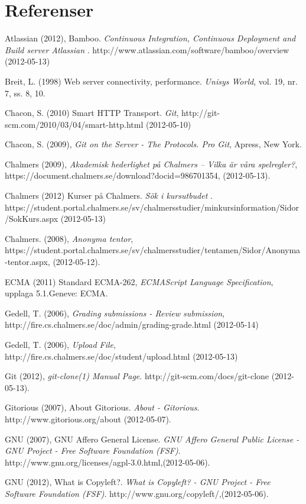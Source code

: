 
\renewcommand{\thechapter}{}
\chapter{Referenser}
\begin{flushleft}
\small
Atlassian (2012), Bamboo. \emph{Continuous Integration, Continuous Deployment and Build server Atlassian  }. http://www.atlassian.com/software/bamboo/overview (2012-05-13)

Breit, L. (1998) Web server connectivity, performance. \emph{Unisys World}, vol. 19, nr. 7, ss. 8, 10.

Chacon, S. (2010) Smart HTTP Transport. \emph{Git}, http://git-scm.com/2010/03/04/smart-http.html (2012-05-10)

Chacon, S. (2009), \emph{Git on the Server - The Protocols. Pro Git}, Apress, New York.

Chalmers (2009), \emph{Akademisk hederlighet på Chalmers – Vilka är våra spelregler?}, https://document.chalmers.se/download?docid=986701354, (2012-05-13).

Chalmers (2012) Kurser på Chalmers. \emph{Sök i kursutbudet} . https://student.portal.chalmers.se/sv/chalmersstudier/minkursinformation/Sidor/SokKurs.aspx (2012-05-13)

Chalmers. (2008), \emph{Anonyma tentor}, https://student.portal.chalmers.se/sv/chalmersstudier/tentamen/Sidor/Anonyma-tentor.aspx, (2012-05-12).

ECMA (2011) Standard ECMA-262, \emph{ECMAScript Language Specification}, upplaga 5.1.Geneve: ECMA.

Gedell, T. (2006), \emph{Grading submissions - Review submission}, http://fire.cs.chalmers.se/doc/admin/grading-grade.html (2012-05-14)

Gedell, T. (2006), \emph{Upload File}, http://fire.cs.chalmers.se/doc/student/upload.html (2012-05-13)

Git (2012), \emph{git-clone(1) Manual Page}. http://git-scm.com/docs/git-clone (2012-05-13).

Gitorious (2007), About Gitorious. \emph{ About - Gitorious}. http://www.gitorious.org/about (2012-05-07).

GNU (2007), GNU Affero General License. \emph{GNU Affero General Public License - GNU Project - Free Software Foundation (FSF)}. http://www.gnu.org/licenses/agpl-3.0.html,(2012-05-06).

GNU (2012), What is Copyleft?. \emph{What is Copyleft? - GNU Project - Free Software Foundation (FSF)}. http://www.gnu.org/copyleft/,(2012-05-06).


\end{flushleft}
